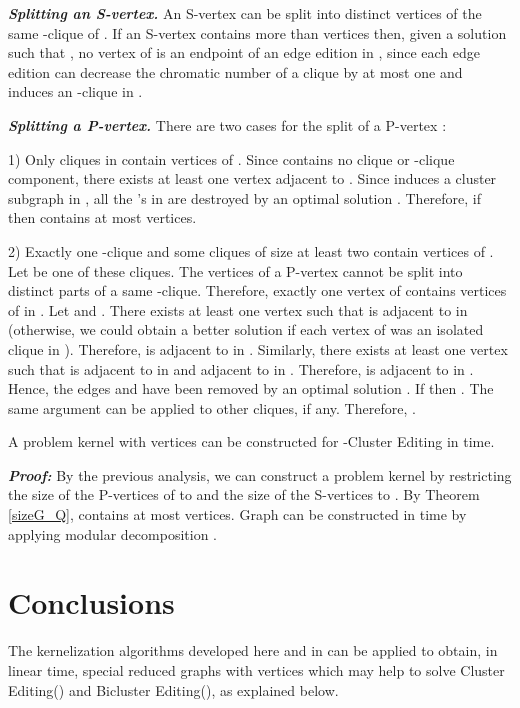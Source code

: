 \documentclass[12pt]{article}
\begin{document}
\emph{\textbf{Splitting an S-vertex.}} An S-vertex can be
split into distinct vertices of the same -clique of
. If an S-vertex  contains more than 
vertices then, given a solution  such that , no
vertex of  is an endpoint of an edge edition in , since each
edge edition can decrease the chromatic number of a clique by at
most one and  induces an -clique in .


\emph{\textbf{Splitting a P-vertex.}} There are two cases for
the split of a P-vertex :

1) Only cliques in  contain vertices of . Since 
contains no clique or -clique component, there exists at
least one vertex  adjacent to . Since  induces
a cluster subgraph in , all the 's in  are
destroyed by an optimal solution . Therefore, if  then  contains at most  vertices.

2) Exactly one -clique  and some cliques of size at least
two contain vertices of . Let  be one of these cliques. The
vertices of a P-vertex cannot be split into distinct parts of a
same -clique. Therefore, exactly one vertex of  contains
vertices of  in . Let  and . There exists at least one vertex  such that  is adjacent to  in  (otherwise, we could
obtain a better solution if each vertex of  was an isolated
clique in ). Therefore,  is adjacent to  in .
Similarly, there exists at least one vertex  such that  is adjacent to  in  and adjacent to
 in . Therefore,  is adjacent to  in . Hence, the
edges  and 
have been removed by an optimal solution . If  then
. The same argument can be applied to other
cliques, if any. Therefore, .


\begin{teo}
A problem kernel with  vertices can be constructed
for {\sc -Cluster Editing} in  time.
\end{teo}

\emph{\textbf{Proof:}} By the previous analysis, we can construct
a problem kernel  by restricting the size of the P-vertices
of  to  and the size of the S-vertices to
. By Theorem \ref{sizeG_Q},  contains at most
 vertices. Graph 
can be constructed in  time by applying modular
decomposition \cite{DSPS2006,DSPS2009}. \hfill \framebox[.09in]


\section{Conclusions} \label{sec5}

The kernelization algorithms developed here and in \cite{DSPS2006,DSPS2009} can be applied to obtain, in linear time, special reduced graphs with  vertices which may help to solve {\sc Cluster Editing()} and {\sc Bicluster Editing()}, as explained below.
\end{document}
